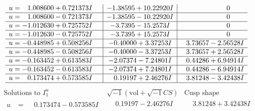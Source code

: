 \documentclass[1p]{elsarticle_modified}
\theoremstyle{definition}
\newcommand{\I}{\sqrt{-1}}
\begin{document}
$$\begin{array}{c|c|c}
\begin{aligned}
u &= \phantom{-}1.008600 + 0.721373 I\end{aligned}
 & -1.38595 + 10.22920 I & \phantom{-0.000000 } 0 \\ \hline\begin{aligned}
u &= \phantom{-}1.008600 - 0.721373 I\end{aligned}
 & -1.38595 - 10.22920 I & \phantom{-0.000000 } 0 \\ \hline\begin{aligned}
u &= -1.012630 + 0.725752 I\end{aligned}
 & -3.7395 - 15.2573 I & \phantom{-0.000000 } 0 \\ \hline\begin{aligned}
u &= -1.012630 - 0.725752 I\end{aligned}
 & -3.7395 + 15.2573 I & \phantom{-0.000000 } 0 \\ \hline\begin{aligned}
u &= -0.448985 + 0.508256 I\end{aligned}
 & -0.40000 + 3.37253 I & \phantom{-}3.73657 - 2.56528 I \\ \hline\begin{aligned}
u &= -0.448985 - 0.508256 I\end{aligned}
 & -0.40000 - 3.37253 I & \phantom{-}3.73657 + 2.56528 I \\ \hline\begin{aligned}
u &= -0.163452 + 0.613583 I\end{aligned}
 & -2.07374 - 7.24801 I & \phantom{-}0.44286 + 6.94914 I \\ \hline\begin{aligned}
u &= -0.163452 - 0.613583 I\end{aligned}
 & -2.07374 + 7.24801 I & \phantom{-}0.44286 - 6.94914 I \\ \hline\begin{aligned}
u &= \phantom{-}0.173474 + 0.573585 I\end{aligned}
 & \phantom{-}0.19197 + 2.46276 I & \phantom{-}3.81248 - 3.42438 I\\
 \hline 
 \end{array}$$\newpage$$\begin{array}{c|c|c}  
\text{Solutions to }I^u_{1}& \I (\text{vol} + \sqrt{-1}CS) & \text{Cusp shape}\\
 \hline 
\begin{aligned}
u &= \phantom{-}0.173474 - 0.573585 I\end{aligned}
 & \phantom{-}0.19197 - 2.46276 I & \phantom{-}3.81248 + 3.42438 I \\ \hline\begin{aligned}

\end{aligned}
\end{array}$$
\end{document}
